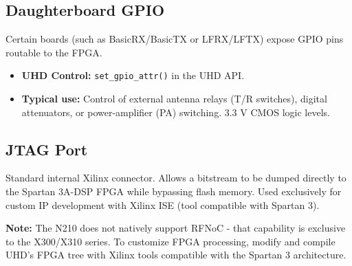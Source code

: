 \documentclass[11pt]{article}
\begin{document}
\subsection*{Daughterboard GPIO}
Certain boards (such as BasicRX/BasicTX or LFRX/LFTX) expose GPIO pins routable to the FPGA.
\begin{itemize}
    \item \textbf{UHD Control:} \texttt{set\_gpio\_attr()} in the UHD API.
    \item \textbf{Typical use:} Control of external antenna relays (T/R switches), digital attenuators, or power-amplifier (PA) switching. 3.3 V CMOS logic levels.
\end{itemize}

\subsection*{JTAG Port}
Standard internal Xilinx connector. Allows a bitstream to be dumped directly to the Spartan 3A-DSP FPGA while bypassing flash memory. Used exclusively for custom IP development with Xilinx ISE (tool compatible with Spartan 3).

\textbf{Note:} The N210 does not natively support RFNoC - that capability is exclusive to the X300/X310 series. To customize FPGA processing, modify and compile UHD's FPGA tree with Xilinx tools compatible with the Spartan 3 architecture.
\end{document}
